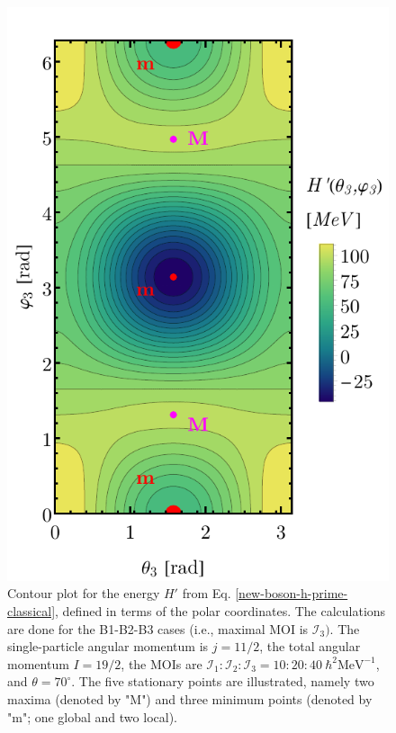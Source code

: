 \begin{figure}
    \begin{center}
        \includegraphics[scale=0.7]{Chapters/Figures/New-Boson-Classical-H-3axis-quantization.pdf}
        \caption{Contour plot for the energy $H'$ from Eq. \ref{new-boson-h-prime-classical}, defined in terms of the polar coordinates. The calculations are done for the B1-B2-B3 cases (i.e., maximal MOI is $\mathcal{I}_3)$. The single-particle angular momentum is $j=11/2$, the total angular momentum $I=19/2$, the MOIs are $\mathcal{I}_1:\mathcal{I}_2:\mathcal{I}_3=10:20:40\ \hbar^2\text{MeV}^{-1}$, and $\theta=70^\circ$. The five stationary points are illustrated, namely two maxima (denoted by "M") and three minimum points (denoted by "m"; one global and two local).}
        \label{new-boson-hprime-3axis-contour-plot}
    \end{center}
\end{figure}
